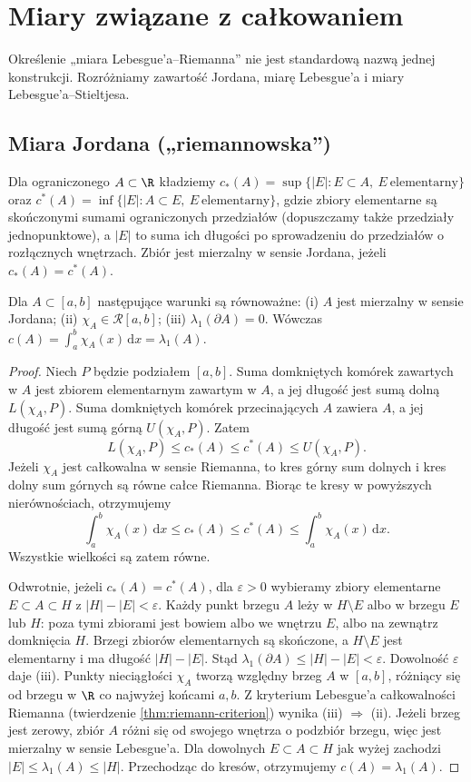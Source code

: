 \section{Miary związane z całkowaniem}
\providecommand{\atlasref}[2]{#2}
Określenie „miara Lebesgue'a--Riemanna” nie jest standardową nazwą jednej konstrukcji. Rozróżniamy zawartość Jordana, miarę Lebesgue'a i miary Lebesgue'a--Stieltjesa.
\subsection*{Miara Jordana („riemannowska”)}
Dla ograniczonego $A\subset\R$ kładziemy $c_*(A)=\sup\{|E|:E\subset A,\ E\ \text{elementarny}\}$ oraz $c^*(A)=\inf\{|E|:A\subset E,\ E\ \text{elementarny}\}$, gdzie zbiory elementarne są skończonymi sumami ograniczonych przedziałów (dopuszczamy także przedziały jednopunktowe), a $|E|$ to suma ich długości po sprowadzeniu do przedziałów o rozłącznych wnętrzach. Zbiór jest mierzalny w sensie Jordana, jeżeli $c_*(A)=c^*(A)$.
\begin{stwierdzenie}\label{it:thm:jordan-criterion}
Dla $A\subset[a,b]$ następujące warunki są równoważne: (i) $A$ jest mierzalny w sensie Jordana; (ii) $\chi_A\in\mathcal R[a,b]$; (iii) $\lambda_1(\partial A)=0$. Wówczas $c(A)=\int_a^b\chi_A(x)\,\mathrm dx=\lambda_1(A)$.
\end{stwierdzenie}
\begin{proof}
Niech $P$ będzie podziałem $[a,b]$. Suma domkniętych komórek zawartych w $A$ jest zbiorem elementarnym zawartym w $A$, a jej długość jest sumą dolną $L(\chi_A,P)$. Suma domkniętych komórek przecinających $A$ zawiera $A$, a jej długość jest sumą górną $U(\chi_A,P)$. Zatem
\[
 L(\chi_A,P)\le c_*(A)\le c^*(A)\le U(\chi_A,P).
\]
Jeżeli $\chi_A$ jest całkowalna w sensie Riemanna,
to kres górny sum dolnych i kres dolny sum górnych
są równe całce Riemanna. Biorąc te kresy w powyższych
nierównościach, otrzymujemy
\[
 \int_a^b\chi_A(x)\,\mathrm dx
 \le c_*(A)\le c^*(A)
 \le\int_a^b\chi_A(x)\,\mathrm dx.
\]
Wszystkie wielkości są zatem równe.

Odwrotnie, jeżeli $c_*(A)=c^*(A)$, dla $\varepsilon>0$ wybieramy zbiory elementarne $E\subset A\subset H$ z $|H|-|E|<\varepsilon$. Każdy punkt brzegu $A$ leży w $H\setminus E$ albo w brzegu $E$ lub $H$: poza tymi zbiorami jest bowiem albo we wnętrzu $E$, albo na zewnątrz domknięcia $H$. Brzegi zbiorów elementarnych są skończone, a $H\setminus E$ jest elementarny i ma długość $|H|-|E|$. Stąd $\lambda_1(\partial A)\le |H|-|E|<\varepsilon$. Dowolność $\varepsilon$ daje (iii).
Punkty nieciągłości $\chi_A$ tworzą względny brzeg $A$ w $[a,b]$, różniący się od brzegu w $\R$ co najwyżej końcami $a,b$. Z kryterium Lebesgue'a całkowalności Riemanna (twierdzenie \ref{thm:riemann-criterion}) wynika (iii) $\Rightarrow$ (ii).
Jeżeli brzeg jest zerowy, zbiór $A$ różni się od swojego wnętrza o podzbiór brzegu, więc jest mierzalny w sensie Lebesgue'a. Dla dowolnych $E\subset A\subset H$ jak wyżej zachodzi $|E|\le\lambda_1(A)\le |H|$. Przechodząc do kresów, otrzymujemy $c(A)=\lambda_1(A)$.
\end{proof}
